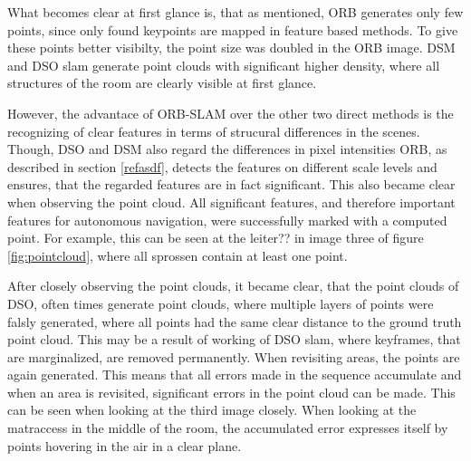 What becomes clear at first glance is, that as mentioned, ORB generates only few points, since only found keypoints are mapped in feature based methods.
 To give these  points better visibilty, the point size was doubled in the ORB image. DSM and DSO slam generate point clouds with significant higher 
 density, where all structures of the room are clearly visible at first glance. 
 
 However, the advantace of ORB-SLAM over the other two direct methods 
 is the recognizing of clear features in terms of strucural differences in the scenes. Though, DSO and DSM also regard the differences in pixel intensities
 ORB, as described in section \ref{refasdf}, detects the features on different scale levels and ensures, that the regarded features are in fact significant. 
 This also became clear when observing the point cloud. All significant features, and therefore important features for autonomous navigation, were successfully 
 marked with a computed point. For example, this can be seen at the leiter?? in image three of figure \ref{fig:pointcloud}, where all sprossen contain at least 
 one point. 
 
 After closely observing the point clouds, it became clear, that the point clouds of DSO, often times generate point clouds, where multiple layers of 
 points were falsly generated, where all points had the same clear distance to the ground truth point cloud. This may be a result of working of DSO slam, 
 where keyframes, that are marginalized, are removed permanently. When revisiting areas, the points are again generated. This means that all errors made
 in the sequence accumulate and when an area is revisited, significant errors in the point cloud can be made. This can be seen when looking at the 
 third image closely. When looking at the matraccess in the middle of the room, the accumulated error expresses itself by points hovering in the air 
 in a clear plane. 
 

